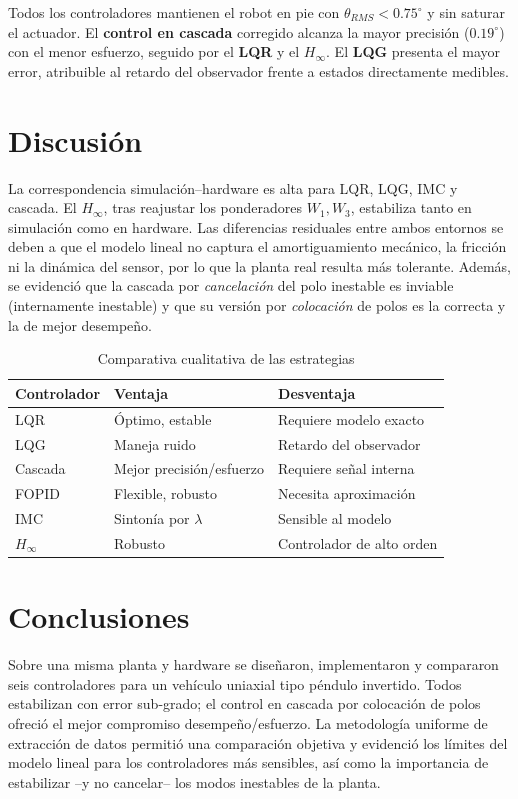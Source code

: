 \documentclass[conference]{IEEEtran}
\begin{document}
Todos los controladores mantienen el robot en pie con $\theta_{RMS}<0.75^\circ$ y
sin saturar el actuador. El \textbf{control en cascada} corregido alcanza la mayor
precisi\'on ($0.19^\circ$) con el menor esfuerzo, seguido por el \textbf{LQR} y el
\textbf{$H_\infty$}. El \textbf{LQG} presenta el mayor error, atribuible al retardo
del observador frente a estados directamente medibles.

\section{Discusi\'on}
La correspondencia simulaci\'on--hardware es alta para LQR, LQG, IMC y cascada. El
$H_\infty$, tras reajustar los ponderadores $W_1,W_3$, estabiliza tanto en
simulaci\'on como en hardware. Las diferencias residuales entre ambos entornos se
deben a que el modelo lineal no captura el amortiguamiento mec\'anico, la
fricci\'on ni la din\'amica del sensor, por lo que la planta real resulta m\'as
tolerante. Adem\'as, se evidenci\'o que la cascada por \emph{cancelaci\'on} del
polo inestable es inviable (internamente inestable) y que su versi\'on por
\emph{colocaci\'on} de polos es la correcta y la de mejor desempe\~no.

\begin{table}[htbp]
\centering
\caption{Comparativa cualitativa de las estrategias}
\label{tab:cualitativa}
\footnotesize
\begin{tabular}{|l|l|l|}
\hline
\textbf{Controlador} & \textbf{Ventaja} & \textbf{Desventaja} \\
\hline
LQR & \'Optimo, estable & Requiere modelo exacto \\
LQG & Maneja ruido & Retardo del observador \\
Cascada & Mejor precisi\'on/esfuerzo & Requiere se\~nal interna \\
FOPID & Flexible, robusto & Necesita aproximaci\'on \\
IMC & Sinton\'ia por $\lambda$ & Sensible al modelo \\
$H_\infty$ & Robusto & Controlador de alto orden \\
\hline
\end{tabular}
\end{table}

\section{Conclusiones}
Sobre una misma planta y hardware se dise\~naron, implementaron y compararon seis
controladores para un veh\'iculo uniaxial tipo p\'endulo invertido. Todos
estabilizan con error sub-grado; el control en cascada por colocaci\'on de polos
ofreci\'o el mejor compromiso desempe\~no/esfuerzo. La metodolog\'ia uniforme de
extracci\'on de datos permiti\'o una comparaci\'on objetiva y evidenci\'o los
l\'imites del modelo lineal para los controladores m\'as sensibles, as\'i como la
importancia de estabilizar --y no cancelar-- los modos inestables de la planta.
\end{document}
